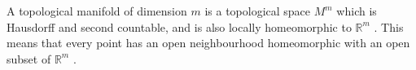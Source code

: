  A topological manifold of dimension
 $ m $  is a topological space  $ M^m $  which is Hausdorff and
second countable, and is also locally
homeomorphic to  $  \mathbb{R}^m $ . This means that every
point has an open neighbourhood homeomorphic with an open
subset of  $  \mathbb{R}^m $ .


